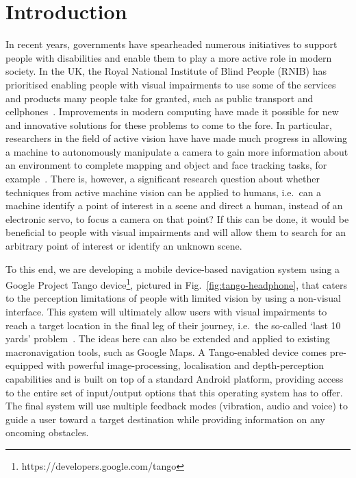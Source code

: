 \documentclass[sigconf, review=true, screen=true, anonymous=true]{acmart}
\begin{document}


\maketitle
\renewcommand{\shortauthors}{JC Lock et al.}

\section{Introduction}

In recent years, governments have spearheaded numerous initiatives to support people with disabilities and enable them to play a more active role in modern society. In the UK, the Royal National Institute of Blind People (RNIB) has prioritised enabling people with visual impairments to use some of the services and products many people take for granted, such as public transport and cellphones~\cite{rnib-objectives}. Improvements in modern computing have made it possible for new and innovative solutions for these problems to come to the fore. In particular, researchers in the field of active vision have have made much progress in allowing a machine to autonomously manipulate a camera to gain more information about an environment to complete mapping and object and face tracking tasks, for example~\cite{bajcsy2018revisiting}. There is, however, a significant research question about whether techniques from active machine vision can be applied to humans, i.e.\ can a machine identify a point of interest in a scene and direct a human, instead of an electronic servo, to focus a camera on that point? If this can be done, it would be beneficial to people with visual impairments and will allow them to search for an arbitrary point of interest or identify an unknown scene. 

To this end, we are developing a mobile device-based navigation system using a Google Project Tango device\footnote{https://developers.google.com/tango}, pictured in Fig.~\ref{fig:tango-headphone}, that caters to the perception limitations of people with limited vision by using a non-visual interface. This system will ultimately allow users with visual impairments to reach a target location in the final leg of their journey, i.e.\ the so-called `last 10 yards' problem~\cite{google2016blind,bellotto2013}. The ideas here can also be extended and applied to existing macronavigation tools, such as Google Maps. A Tango-enabled device comes pre-equipped with powerful image-processing, localisation and depth-perception capabilities and is built on top of a standard Android platform, providing access to the entire set of input/output options that this operating system has to offer. The final system will use multiple feedback modes (vibration, audio and voice) to guide a user toward a target destination while providing information on any oncoming obstacles.
\end{document}
